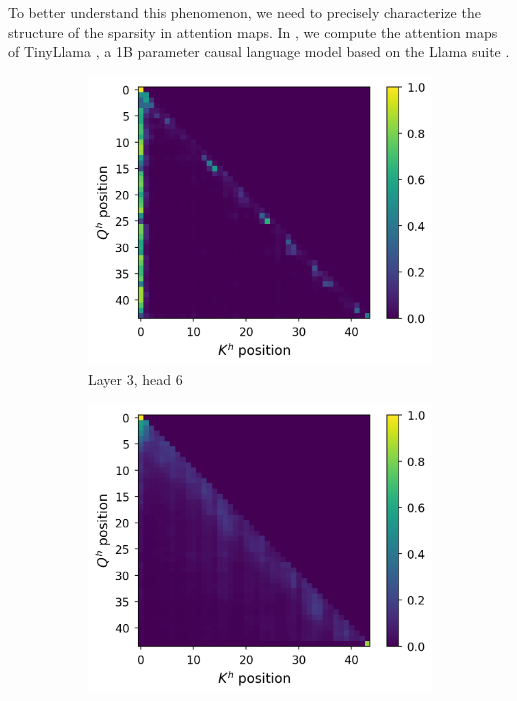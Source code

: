 To better understand this phenomenon, we need to precisely characterize the structure of the sparsity in attention maps. In , we compute the attention maps of TinyLlama \citep{tinyllama}, a 1B parameter causal language model based on the Llama suite \citep{touvron2023llama}.

\begin{figure}[!ht]
\centering
\begin{subfigure}[b]{0.45\columnwidth}
     \includegraphics[width=\linewidth]{sources/part_1/anisotropy/imgs/qk_position_l2h5.png}
     \caption{Layer 3, head 6}
     \label{fig:l2h5}
\end{subfigure}
\hfill
\begin{subfigure}[b]{0.45\columnwidth}
     \includegraphics[width=\linewidth]{sources/part_1/anisotropy/imgs/qk_position_l12h5.png}

\end{subfigure}
\end{figure}
